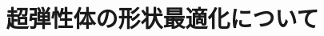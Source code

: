\documentclass[11pt]{jsarticle}
\begin{document}
	\title{超弾性体の形状最適化について}
	\maketitle
	\newpage
	
	
	
	
	
\end{document}
